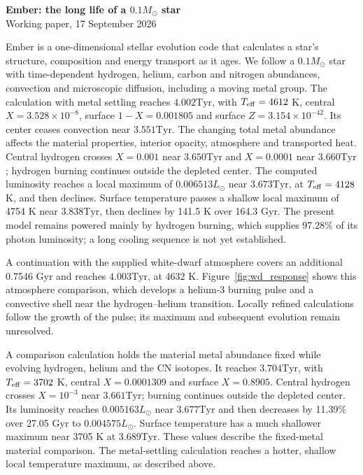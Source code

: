 \documentclass[11pt,letterpaper]{article}
\newcommand{\Ms}{M_\odot}\newcommand{\Rs}{R_\odot}\newcommand{\Ls}{L_\odot}
\newcommand{\Tyr}{\mathrm{Tyr}}
\begin{document}
\begin{center}
{\Large\bfseries Ember: the long life of a $0.1\Ms$ star}\\[8pt]
{\small Working paper, 17 September 2026}
\end{center}

Ember is a one-dimensional stellar evolution code that calculates a star's
structure, composition and energy transport as it ages.
We follow a $0.1\Ms$ star with time-dependent hydrogen, helium, carbon and
nitrogen abundances, convection and microscopic diffusion, including a moving
metal group. The calculation with metal settling reaches $4.002\Tyr$,
with $T_{\rm eff}=4612$ K, central $X=3.528\times10^{-8}$,
surface $1-X=0.001805$ and surface $Z=3.154\times10^{-42}$.
Its center ceases convection near $3.551\Tyr$. The changing total metal abundance affects the material
properties, interior opacity, atmosphere and transported heat. Central hydrogen crosses $X=0.001$
near $3.650\Tyr$ and $X=0.0001$ near $3.660\Tyr$; hydrogen burning
continues outside the depleted center. The computed luminosity reaches a
local maximum of $0.006513\Ls$ near $3.673\Tyr$, at $T_{\rm eff}=4128$ K,
and then declines. Surface temperature passes a shallow local maximum of 4754 K
near $3.838\Tyr$, then declines by 141.5 K
over 164.3 Gyr. The present model remains powered mainly by
hydrogen burning, which supplies 97.28\% of its photon luminosity; a long cooling sequence is not yet established.

A continuation with the supplied white-dwarf atmosphere covers an additional
0.7546 Gyr and reaches $4.003\Tyr$, at 4632 K.
Figure~\ref{fig:wd_response} shows this atmosphere comparison, which develops
a helium-3 burning pulse and a convective shell near the hydrogen--helium
transition. Locally refined calculations follow the growth of the pulse;
its maximum and subsequent evolution remain unresolved.



A comparison calculation holds the material metal abundance fixed while
evolving hydrogen, helium and the CN isotopes. It reaches $3.704\Tyr$,
with $T_{\rm eff}=3702$ K, central $X=0.0001309$ and surface $X=0.8905$.
Central hydrogen crosses $X=10^{-3}$ near $3.661\Tyr$; burning continues
outside the depleted center. Its luminosity reaches $0.005163\Ls$ near
$3.677\Tyr$ and then decreases by 11.39\% over 27.05 Gyr to
$0.004575\Ls$. Surface temperature has a much shallower maximum near
3705 K at $3.689\Tyr$. These values describe the fixed-metal material comparison. The metal-settling calculation reaches a hotter, shallow local
temperature maximum, as described above.
\end{document}
